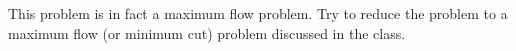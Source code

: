 This problem is in fact a maximum flow problem.
Try to reduce the problem to a maximum flow (or minimum cut) problem discussed in the class.